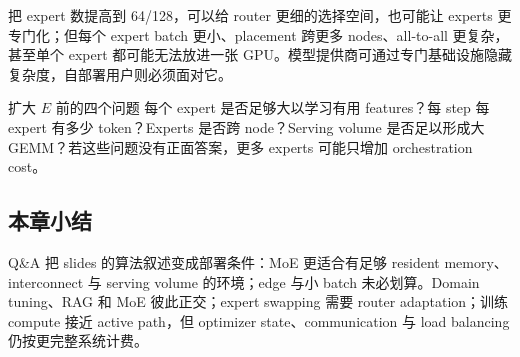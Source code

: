 把 expert 数提高到 64/128，可以给 router 更细的选择空间，也可能让 experts 更专门化；但每个 expert batch 更小、placement 跨更多 nodes、all-to-all 更复杂，甚至单个 expert 都可能无法放进一张 GPU。模型提供商可通过专门基础设施隐藏复杂度，自部署用户则必须面对它。

\begin{importantbox}{扩大 $E$ 前的四个问题}
每个 expert 是否足够大以学习有用 features？每 step 每 expert 有多少 token？Experts 是否跨 node？Serving volume 是否足以形成大 GEMM？若这些问题没有正面答案，更多 experts 可能只增加 orchestration cost。
\end{importantbox}


\subsection{本章小结}

Q\&A 把 slides 的算法叙述变成部署条件：MoE 更适合有足够 resident memory、interconnect 与 serving volume 的环境；edge 与小 batch 未必划算。Domain tuning、RAG 和 MoE 彼此正交；expert swapping 需要 router adaptation；训练 compute 接近 active path，但 optimizer state、communication 与 load balancing 仍按更完整系统计费。

